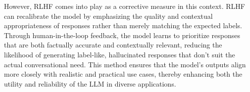 \documentclass[conference]{IEEEtran}
\begin{document}
However, RLHF comes into play as a corrective measure in this context. RLHF can recalibrate the model by emphasizing the quality and contextual appropriateness of responses rather than merely matching the expected labels. Through human-in-the-loop feedback, the model learns to prioritize responses that are both factually accurate and contextually relevant, reducing the likelihood of generating label-like, hallucinated responses that don't suit the actual conversational need. This method ensures that the model's outputs align more closely with realistic and practical use cases, thereby enhancing both the utility and reliability of the LLM in diverse applications.
\end{document}
